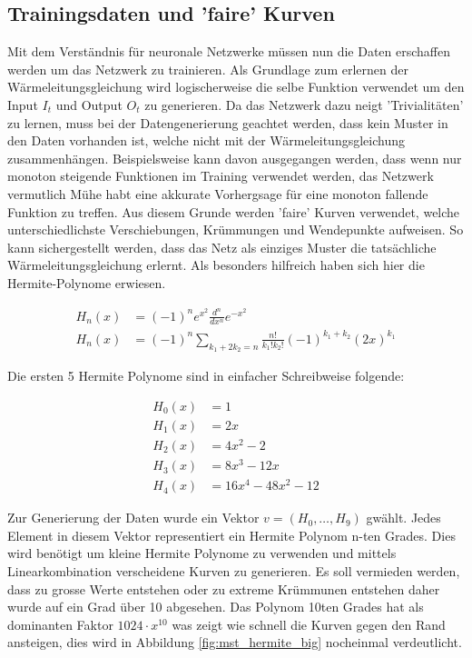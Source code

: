 \subsection{Trainingsdaten und 'faire' Kurven}
Mit dem Verständnis für neuronale Netzwerke müssen nun die Daten erschaffen werden um das Netzwerk zu trainieren. Als Grundlage zum erlernen der Wärmeleitungsgleichung wird logischerweise die selbe Funktion verwendet um den Input $I_{t}$ und Output $O_{t}$ zu generieren. Da das Netzwerk dazu neigt 'Trivialitäten' zu lernen, muss bei der Datengenerierung geachtet werden, dass kein Muster in den Daten vorhanden ist, welche nicht mit der Wärmeleitungsgleichung zusammenhängen. Beispielsweise kann davon ausgegangen werden, dass wenn nur monoton steigende Funktionen im Training verwendet werden, das Netzwerk vermutlich Mühe habt eine akkurate Vorhergsage für eine monoton fallende Funktion zu treffen. Aus diesem Grunde werden 'faire' Kurven verwendet, welche unterschiedlichste Verschiebungen, Krümmungen und Wendepunkte aufweisen. So kann sichergestellt werden, dass das Netz als einziges Muster die tatsächliche Wärmeleitungsgleichung erlernt. Als besonders hilfreich haben sich hier die Hermite-Polynome erwiesen.

\begin{align}
H_{n}(x) &=(-1)^{n}e^{x^{2}}{\frac {d^{n}}{d x^{n}}}e^{-x^{2}} \\
H_{n}(x) &=(-1)^{n}\sum _{k_{1}+2k_{2}=n}{\frac {n!}{k_{1}!k_{2}!}}(-1)^{k_{1}+k_{2}}(2x)^{k_{1}}
\end{align}

Die ersten 5 Hermite Polynome sind in einfacher Schreibweise folgende:

\begin{align}
H_{0}(x) &= 1\\
H_{1}(x) &= 2x\\
H_{2}(x) &= 4x^{2}-2\\
H_{3}(x) &= 8x^{3}-12x\\
H_{4}(x) &= 16x^{4}-48x^{2}-12
\end{align}

Zur Generierung der Daten wurde ein Vektor $v=(H_0, \dots ,H_9)$ gwählt. Jedes Element in diesem Vektor representiert ein Hermite Polynom n-ten Grades. Dies wird benötigt um kleine Hermite Polynome zu verwenden und mittels Linearkombination verscheidene Kurven zu generieren. Es soll vermieden werden, dass zu grosse Werte entstehen oder zu extreme Krümmunen entstehen daher wurde auf ein Grad über 10 abgesehen. Das Polynom 10ten Grades hat als dominanten Faktor $1024 \cdot x^{10}$ was zeigt wie schnell die Kurven gegen den Rand ansteigen, dies wird in Abbildung \ref{fig:mst_hermite_big} nocheinmal verdeutlicht.

